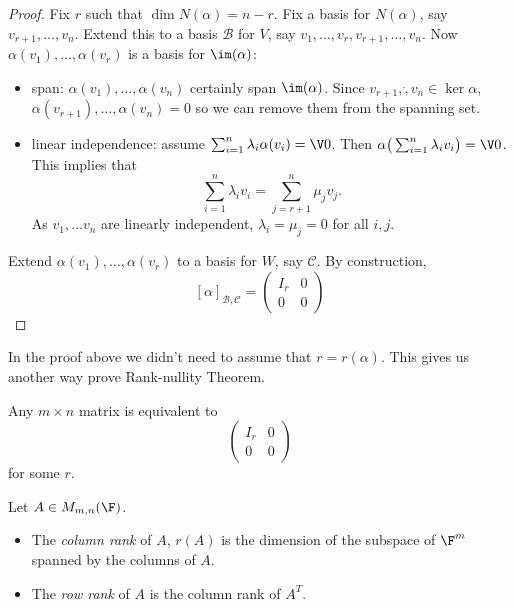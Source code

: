 \documentclass[a4paper]{article}
\newcommand*{\basis}{\mathcal}
\theoremstyle{definition}
\begin{document}
\begin{proof}
  Fix \(r\) such that \(\dim N(\alpha) = n-r\). Fix a basis for \(N(\alpha)\), say \(v_{r+1},\dots,v_n\). Extend this to a basis \(\basis B\) for \(V\), say \(v_1,\dots,v_r,v_{r+1},\dots,v_n\). Now \(\alpha(v_1),\dots,\alpha(v_r)\) is a basis for \(\im(\alpha)\):
  \begin{itemize}
  \item span: \(\alpha(v_1),\dots, \alpha(v_n)\) certainly span \(\im(\alpha)\). Since \(v_{r+1},\dot,v_n \in \ker \alpha\), \(\alpha(v_{r+1}),\dots,\alpha(v_n) = 0\) so we can remove them from the spanning set.
  \item linear independence: assume \(\sum_{i=1}^{n}\lambda_i \alpha(v_i) =\V 0 \). Then \(\alpha \big(\sum_{i=1}^n\lambda_iv_i\big) =\V0\). This implies that
    \[
      \sum_{i=1}^{n}\lambda_iv_i = \sum_{j=r+1}^{n}\mu_jv_j.
    \]
    As \(v_1,\dots v_n\) are linearly independent, \(\lambda_i=\mu_j=0\) for all \(i,j\).
  \end{itemize}
  Extend \(\alpha(v_1),\dots,\alpha(v_r)\) to a basis for \(W\), say \(\basis C\). By construction,
  \[
    [\alpha]_{\basis B,\basis C} =
    \begin{pmatrix}
      I_r & 0 \\
      0 & 0
    \end{pmatrix}
  \]
\end{proof}

\begin{remark}
  In the proof above we didn't need to assume that \(r = r(\alpha)\). This gives us another way prove Rank-nullity Theorem.
\end{remark}

\begin{corollary}
  Any \(m\times n\) matrix is equivalent to
  \[
  \begin{pmatrix}
      I_r & 0 \\
      0 & 0
    \end{pmatrix}
  \]
  for some \(r\).
\end{corollary}

\begin{definition}
  Let \(A\in M_{m,n}(\F)\).
  \begin{itemize}
  \item The \emph{column rank} of \(A\), \(r(A)\) is the dimension of the subspace of \(\F^m\) spanned by the columns of \(A\).
  \item The \emph{row rank} of \(A\) is the column rank of \(A^T\).
  \end{itemize}
\end{definition}
\end{document}
